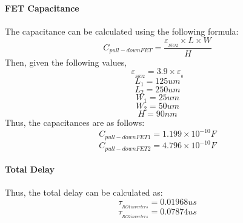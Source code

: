 \documentclass[12pt]{article}
\begin{document}
\paragraph{FET Capacitance} The capacitance can be calculated using the following formula:
\[C_{pull-down FET} = \frac{\varepsilon_{_{SiO2}} \times L \times W}{H} \]
Then, given the following values,
\[\varepsilon_{_{SiO2}} = 3.9 \times \varepsilon_{_0} \]
\[L_1 = 125um\]
\[L_2 = 250um\]
\[W_1 = 25um\]
\[W_2 = 50um\]
\[H = 90nm \]
Thus, the capacitances are as follows:
\[C_{pull-down FET 1} = 1.199 \times 10^{-10}F\]
\[C_{pull-down FET 2} = 4.796 \times 10^{-10}F\]

\paragraph{Total Delay}
Thus, the total delay can be calculated as:
\[\tau_{_{RO1 inverters}} =  0.01968us\]
\[\tau_{_{RO2 inverters}} =  0.07874us\]
\end{document}
